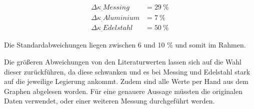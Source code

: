 \begin{align*}
\Delta\kappa_.{Messing}		&=\SI{29}{\percent}\\
\Delta\kappa_.{Aluminium}	&=\SI{7}{\percent}\\
\Delta\kappa_.{Edelstahl}		&=\SI{50}{\percent}
\end{align*}

Die Standardabweichungen liegen zwischen 6 und 10 \% und somit im Rahmen.

Die größeren Abweichungen von den Literaturwerten lassen sich auf die Wahl dieser zurückführen, da diese schwanken und es bei Messing und Edelstahl stark auf die jeweilige Legierung ankommt. Zudem sind alle Werte per Hand aus dem Graphen abgelesen worden. Für eine genauere Aussage müssten die originalen Daten verwendet, oder einer weiteren Messung durchgeführt werden.


